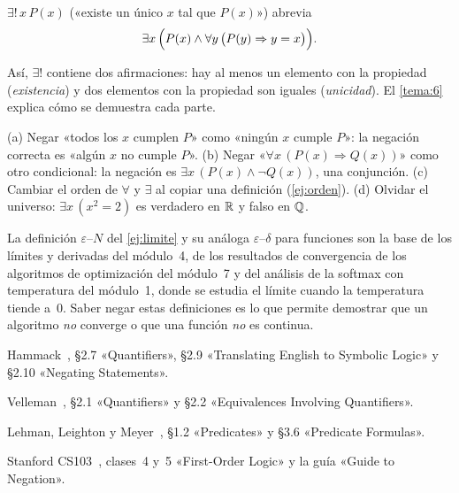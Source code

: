 \begin{definicion}\label{def:unicidad}
$\exists!\,x\,P(x)$ («existe un único $x$ tal que $P(x)$») abrevia
\[
\exists x\,\Bigl(P(x)\wedge\forall y\,\bigl(P(y)\Rightarrow y=x\bigr)\Bigr).
\]
\end{definicion}

Así, $\exists!$ contiene dos afirmaciones: hay al menos un elemento con la propiedad (\emph{existencia}) y dos elementos con la propiedad son iguales (\emph{unicidad}). El \cref{tema:6} explica cómo se demuestra cada parte.

\begin{observacion}\label{obs:2-errores}
(a) Negar «todos los $x$ cumplen $P$» como «ningún $x$ cumple $P$»: la negación correcta es «algún $x$ no cumple $P$».
(b) Negar «$\forall x\,(P(x)\Rightarrow Q(x))$» como otro condicional: la negación es $\exists x\,(P(x)\wedge\neg Q(x))$, una conjunción.
(c) Cambiar el orden de $\forall$ y $\exists$ al copiar una definición (\cref{ej:orden}).
(d) Olvidar el universo: $\exists x\,(x^{2}=2)$ es verdadero en $\mathbb{R}$ y falso en $\mathbb{Q}$.
\end{observacion}

\begin{observacion}
La definición $\varepsilon$–$N$ del \cref{ej:limite} y su análoga $\varepsilon$–$\delta$ para funciones son la base de los límites y derivadas del módulo~4, de los resultados de convergencia de los algoritmos de optimización del módulo~7 y del análisis de la softmax con temperatura del módulo~1, donde se estudia el límite cuando la temperatura tiende a~0. Saber negar estas definiciones es lo que permite demostrar que un algoritmo \emph{no} converge o que una función \emph{no} es continua.
\end{observacion}

\begin{lecturas}
\item Hammack~\cite{hammack}, §2.7 «Quantifiers», §2.9 «Translating English to Symbolic Logic» y §2.10 «Negating Statements».
\item Velleman~\cite{velleman}, §2.1 «Quantifiers» y §2.2 «Equivalences Involving Quantifiers».
\item Lehman, Leighton y Meyer~\cite{mcs}, §1.2 «Predicates» y §3.6 «Predicate Formulas».
\item Stanford CS103~\cite{cs103}, clases~4 y~5 «First-Order Logic» y la guía «Guide to Negation».
\end{lecturas}

